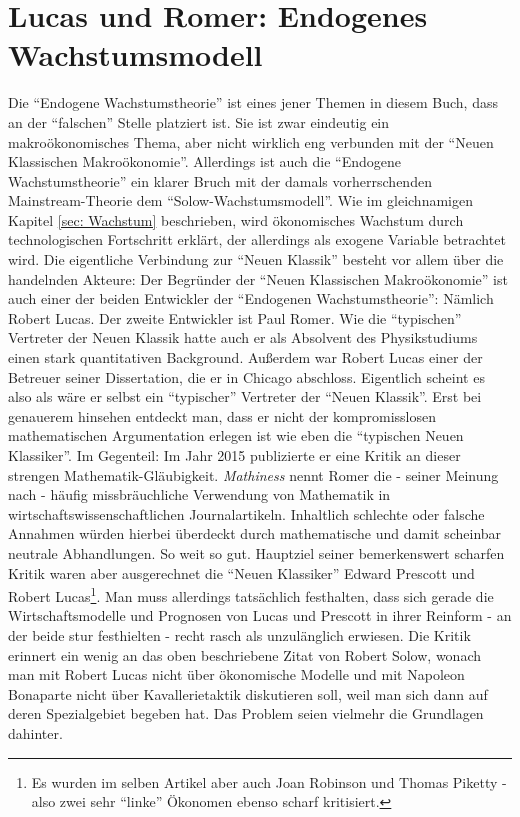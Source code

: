 \section{Lucas und Romer: Endogenes Wachstumsmodell} \label{sec: endogene}
Die "`Endogene Wachstumstheorie"' ist eines jener Themen in diesem Buch, dass an der "`falschen"' Stelle platziert ist. Sie ist zwar eindeutig ein makroökonomisches Thema, aber nicht wirklich eng verbunden mit der "`Neuen Klassischen Makroökonomie"'. Allerdings ist auch die "`Endogene Wachstumstheorie"' ein klarer Bruch mit der damals vorherrschenden Mainstream-Theorie dem "`Solow-Wachstumsmodell"'. Wie im gleichnamigen Kapitel \ref{sec: Wachstum} beschrieben, wird ökonomisches Wachstum durch technologischen Fortschritt erklärt, der allerdings als exogene Variable betrachtet wird.
Die eigentliche Verbindung zur "`Neuen Klassik"' besteht vor allem über die handelnden Akteure: Der Begründer der "`Neuen Klassischen Makroökonomie"' ist auch einer der beiden Entwickler der "`Endogenen Wachstumstheorie"': Nämlich Robert Lucas. Der zweite Entwickler ist Paul Romer. Wie die "`typischen"' Vertreter der Neuen Klassik hatte auch er als Absolvent des Physikstudiums \textcite{Romer2018} einen stark quantitativen Background. Außerdem war Robert Lucas einer der Betreuer seiner Dissertation, die er in Chicago abschloss. Eigentlich scheint es also als wäre er selbst ein "`typischer"' Vertreter der "`Neuen Klassik"'. Erst bei genauerem hinsehen entdeckt man, dass er nicht der kompromisslosen mathematischen Argumentation erlegen ist wie eben die "`typischen Neuen Klassiker"'. Im Gegenteil: Im Jahr 2015 publizierte er eine Kritik an dieser strengen Mathematik-Gläubigkeit. \textit{Mathiness} nennt Romer die - seiner Meinung nach - häufig missbräuchliche Verwendung von Mathematik in wirtschaftswissenschaftlichen Journalartikeln. Inhaltlich schlechte oder falsche Annahmen würden hierbei überdeckt durch mathematische und damit scheinbar neutrale Abhandlungen. So weit so gut. Hauptziel seiner bemerkenswert scharfen Kritik\parencite{Romer2015} waren aber ausgerechnet die "`Neuen Klassiker"' Edward Prescott und Robert Lucas\footnote{Es wurden im selben Artikel aber auch Joan Robinson und Thomas Piketty - also zwei sehr "`linke"' Ökonomen ebenso scharf kritisiert.}. Man muss allerdings tatsächlich festhalten, dass sich gerade die Wirtschaftsmodelle und Prognosen von Lucas und Prescott in ihrer Reinform - an der beide stur festhielten - recht rasch als unzulänglich erwiesen. Die Kritik erinnert ein wenig an das oben beschriebene Zitat von Robert Solow, wonach man mit Robert Lucas nicht über ökonomische Modelle und mit Napoleon Bonaparte nicht über Kavallerietaktik diskutieren soll, weil man sich dann auf deren Spezialgebiet begeben hat. Das Problem seien vielmehr die Grundlagen dahinter.

